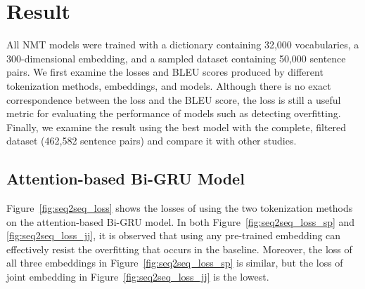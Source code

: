\section{Result} \label{sec:result}

All NMT models were trained with a dictionary containing 32,000 vocabularies, a 300-dimensional embedding, and a sampled dataset containing 50,000 sentence pairs. We first examine the losses and BLEU scores produced by different tokenization methods, embeddings, and models. Although there is no exact correspondence between the loss and the BLEU score, the loss is still a useful metric for evaluating the performance of models such as detecting overfitting. Finally, we examine the result using the best model with the complete, filtered dataset (462,582 sentence pairs) and compare it with other studies.

\subsection{Attention-based Bi-GRU Model}

Figure~\ref{fig:seq2seq_loss} shows the losses of using the two tokenization methods on the attention-based Bi-GRU model. In both Figure~\ref{fig:seq2seq_loss_sp} and \ref{fig:seq2seq_loss_jj}, it is observed that using any pre-trained embedding can effectively resist the overfitting that occurs in the baseline. Moreover, the loss of all three embeddings in Figure~\ref{fig:seq2seq_loss_sp} is similar, but the loss of joint embedding in Figure~\ref{fig:seq2seq_loss_jj} is the lowest.

